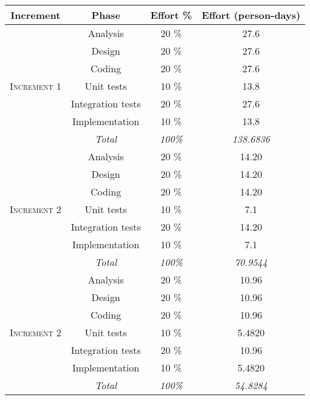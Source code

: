 
\begin{tabular}{|c|c|c|c|}
\hline
\textbf{Increment} & \textbf{Phase} & \textbf{Effort \%} & \textbf{Effort (person-days)} \\ \hline \hline

\multirow{7}{*}{\textsc{Increment 1}} & Analysis & 20 \% & 27.6 \\ \cline{2-4}
& Design & 20 \% & 27.6 \\ \cline{2-4}
& Coding & 20 \% & 27.6 \\ \cline{2-4}
& Unit tests & 10 \% & 13.8 \\ \cline{2-4}
& Integration tests & 20 \% & 27.6 \\ \cline{2-4}
& Implementation & 10 \% & 13.8 \\ \cline{2-4}
& \textit{Total} & \textit{100\%} & \textit{138.6836} \\ \hline \hline

\multirow{7}{*}{\textsc{Increment 2}} & Analysis & 20 \% & 14.20 \\ \cline{2-4}
& Design & 20 \% & 14.20 \\ \cline{2-4}
& Coding & 20 \% & 14.20 \\ \cline{2-4}
& Unit tests & 10 \% & 7.1 \\ \cline{2-4}
& Integration tests & 20 \% & 14.20 \\ \cline{2-4}
& Implementation & 10 \% & 7.1 \\ \cline{2-4}
& \textit{Total} & \textit{100\%} & \textit{70.9544} \\ \hline \hline

\multirow{7}{*}{\textsc{Increment 2}} & Analysis & 20 \% & 10.96 \\ \cline{2-4}
& Design & 20 \% & 10.96 \\ \cline{2-4}
& Coding & 20 \% & 10.96 \\ \cline{2-4}
& Unit tests & 10 \% & 5.4820 \\ \cline{2-4}
& Integration tests & 20 \% & 10.96 \\ \cline{2-4}
& Implementation & 10 \% & 5.4820 \\ \cline{2-4}
& \textit{Total} & \textit{100\%} & \textit{54.8284} \\ \hline

\end{tabular}
